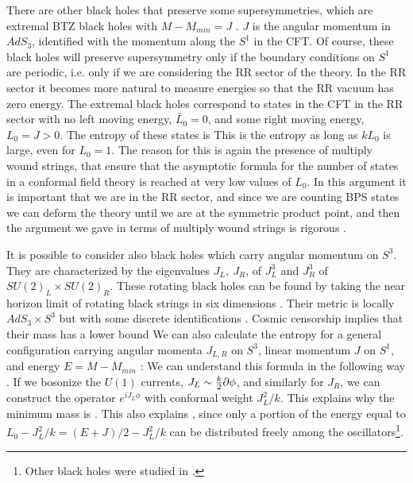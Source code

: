 There are other black holes that preserve some supersymmetries,
which are extremal BTZ black holes with $M-M_{min} = J$
\cite{Coussaert:1994jp}. $J$ is the angular momentum in $AdS_3$,
identified with the
momentum along the $S^1$ in the CFT. 
Of course, these black holes will preserve supersymmetry only if the boundary
conditions on $S^1$ are periodic, i.e. only if we are considering
the RR sector of the theory. In the RR sector it becomes more 
natural to measure energies so that the RR vacuum has zero energy.
The extremal black holes correspond to states in the CFT in the 
RR sector with no left moving energy, $\bar L_0=0$, and some right
moving energy, $ L_0 =J>0$. The entropy of these states is
This is the entropy as long as $k L_0$ is large, even for
$L_0 = 1$. The reason for this is again the presence of 
multiply wound strings, that ensure that the asymptotic 
formula for the number of states in a conformal field theory
is reached at very low values of $L_0$. In this argument it
is important that we are in the RR sector, and since we 
are counting BPS states we can deform the theory until we 
are at the symmetric product point, and then the argument
we gave in terms of multiply wound strings is  rigorous
\cite{Strominger:1996sh,Maldacena:1999bp}. 

It is possible to consider also black holes which carry angular momentum
on $S^3$. They are characterized by the eigenvalues $J_L, ~J_R$, of 
$J_L^3$ and $J_R^3$ of $SU(2)_L\times SU(2)_R $. 
These rotating black holes can be found by taking the near horizon
limit of rotating black strings  in six dimensions 
\cite{Cvetic:1998xh,Cvetic:1996xz}.
Their metric is locally $AdS_3\times S^3$ but with some
discrete identifications \cite{Cvetic:1998ja}.
Cosmic censorship implies that
their mass has a lower bound 
We can also calculate the entropy for a general configuration 
carrying angular momenta $J_{L,R}$
 on $S^3$, linear momentum $J$ on $S^1$, and energy $E = M-M_{min}$ :
We can understand this formula in the following way 
\cite{Breckenridge:1996sn,Breckenridge:1996is}. 
If we bosonize the $U(1)$ currents, $J_{L} \sim {k \over 2} 
\partial \phi $,
and similarly for $J_R$, we can construct the operator
$e^{i J_L \phi}$ with conformal weight $J_L^2/k$. This explains
why the minimum mass is \masslb . This also explains \entropyrot,
since  only a portion of the energy equal to 
 $ L_0-J^2_L/k  = ( E+J)/2-J^2_L/k $ can be distributed freely among
the oscillators\footnote{ Other
black holes were studied in \cite{Kaloper:1998vw}.}. 




